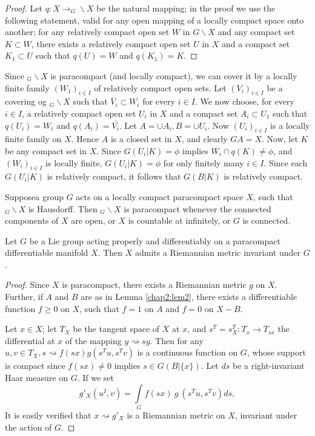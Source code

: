 \begin{proof}
Let $q : X \to_G \backslash X$ be the natural mapping; in the proof we
use the following statement, valid for any open mapping of a locally
compact space onto another; for any relatively compact open set $W$ in
$G \backslash X$ and any compact set $K \subset W$, there exists a
relatively compact open set $U$ in $X$ and a compact set $K_1 \subset
U$ such that $q(U) = W$ and $q(K_1) =K$. 
\end{proof}

Since $_G \backslash X$ is paracompact (and locally compact), we can
cover it by a locally finite family $(W_1)_{i \in I}$ of relatively
compact open sets. Let $(V_i)_{i \in I}$ be a covering og $_G
\backslash X$ such that $\bar{V}_i \subset W_i$ for every $i \in
I$. We now choose, for every $i \in I$, a relatively compact open set
$U_i$ in $X$ and a compact set $A_i \subset U_1$ such that $q(U_i) =
W_i$ and $q(A_i) = \bar{V_i}$. Let $A = \cup A_i, B = \cup U_i$. Now
$(U_i)_{i \in I}$ is a locally finite family on $X$. Hence $A$ is a
closed set in $X$, and clearly $GA = X$. Now, let $K$ be any compact
set in $X$. Since $G(U_i|K) =\phi$ implies $W_i \cap q (K) \neq \phi$,
and $(W_i)_{i \in I}$ is locally finite, $G(U_i | K)= \phi$ for only
finitely many $i \in 
I$. Since each $G(U_i| K)$ is relatively compact, it follows that $G(B
| K)$ is relatively compact. 

\begin{remark*}
  Suppose\pageoriginale a group $G$ acts on a locally compact
  paracompact space $X$, 
  such that $_G \backslash X$ is Hausdorff. Then $_G \backslash X$ is
  paracompact whenever the connected components of $X$ are open, or $X$
  is countable at infinitely, or $G$ is connected. 
\end{remark*}

\begin{thm}\label{chap1:thm2}%
  Let $G$ be a Lie group acting properly and differentiably on a
  paracompact differentiable manifold $X$. Then $X$ admits a
  Riemannian metric invariant under $G$.  
\end{thm}

\begin{proof}
  Since $X$ is paracompact, there exists a Riemannian metric $g$ on
  $X$. Further, if $A$ and $B$ are as in Lemma \ref{chap2:lem2}, there exists a
  differentiable function $f \geq 0$ on $X$, such that $f = 1$ on $A$ and
  $f = 0$ on $X-B$. 

  Let $x \in X$; let $T_X$ be the tangent space of $X$ at $x$, and $s^T
  = s_X^T : T_x \to T_{sx}$ the differential at $x$ of the mapping $y
  \rightsquigarrow sy$. Then for any $u, v \in T_X, s \rightsquigarrow
  f(sx) g (s^Tu, s^Tv)$ is a continuous function on $G$, whose support
  is compact since $f(sx) \neq 0$ implies $s \in G(B| \{ x \})$. Let
  $ds$ be a right-invariant Haar measure on $G$. If we set 
  $$
  g'_X(u^I, v) = \int\limits_G f(sx)~g ~ (s^Tu, s^Tv)ds,
  $$
  It is easily verified that $x \rightsquigarrow g'_X$ is a Riemannian
  metric on $X$, invariant under the action of $G$. 
\end{proof}

